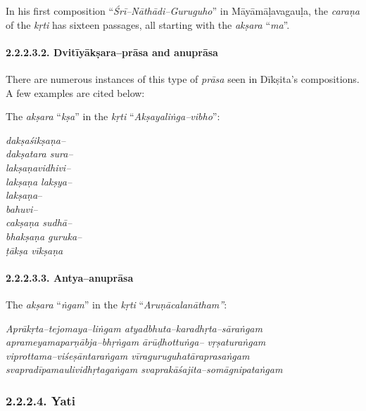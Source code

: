 In his first composition “\textit{Śrī–Nāthādi–Guruguho}” in Māyāmāḷavagauḷa, the \textit{caraṇa} of the \textit{kṛti} has sixteen passages, all starting with the \textit{akṣara} “\textit{ma}”.


\paragraph*{2.2.2.3.2. Dvitīyākṣara–prāsa and anuprāsa}

There are numerous instances of this type of \textit{prāsa} seen in Dīkṣita’s compositions. A few examples are cited below:

The \textit{akṣara} “\textit{kṣa}” in the \textit{kṛti} “\textit{Akṣayaliṅga–vibho}”:

\begin{myquote}
\textit{dakṣaśikṣaṇa–}\\\textit{dakṣatara sura–}\\\textit{lakṣaṇavidhivi–}\\\textit{lakṣaṇa lakṣya–}\\\textit{lakṣaṇa}–\\\textit{bahuvi–}\\\textit{cakṣaṇa sudhā–}\\\textit{bhakṣaṇa guruka–}\\\textit{ṭākṣa vīkṣaṇa}
\end{myquote}


\paragraph*{2.2.2.3.3. Antya–anuprāsa}

The \textit{akṣara} “\textit{ṅgam}” in the \textit{kṛti} “\textit{Aruṇācalanātham”}:

\begin{myquote}
\textit{Aprākṛta–tejomaya–liṅgam atyadbhuta–karadhṛta–sāraṅgam}\\\textit{aprameyamaparṇābja–bhṛṅgam ārūḍhottuṅga– vṛṣaturaṅgam}\\\textit{viprottama–viśeṣāntaraṅgam vīraguruguhatāraprasaṅgam}\\\textit{svapradīpamaulividhṛtagaṅgam svaprakāśajita–somāgnipataṅgam}
\end{myquote}



\subsubsection*{2.2.2.4. Yati}

